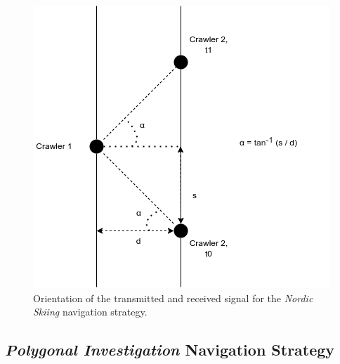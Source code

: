 \begin{figure}[h!]
	\centering
	\includegraphics[scale=0.5]{graphics/angle_ski_nordique.png}
	\caption{Orientation of the transmitted and received signal for the \textit{Nordic Skiing} navigation strategy.}
	\label{fig:angle_ski_nordique}
\end{figure}

\subsection*{\textit{Polygonal Investigation} Navigation Strategy}

